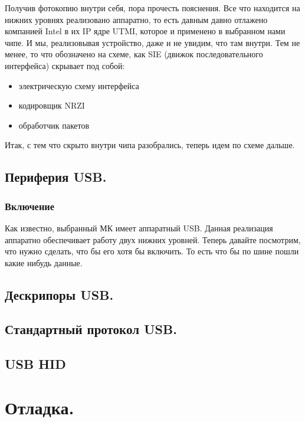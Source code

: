 \documentclass[12pt,a4paper]{article}
\begin{document}
    Получив фотокопию внутри себя, пора прочесть пояснения.
    Все что находится на нижних уровнях реализовано аппаратно, то есть давным
    давно отлажено компанией Intel в их IP ядре UTMI, которое и применено
    в выбранном нами чипе. И мы, реализовывая устройство,
    даже и не увидим, что там внутри. Тем не менее, то
    что обозначено на схеме, как SIE (движок последовательного интерфейса)
    скрывает под собой:
\begin{itemize}
    \item электрическую схему интерфейса
    \item кодировщик NRZI
    \item обработчик пакетов
\end{itemize}
    Итак, с тем что скрыто внутри чипа разобрались, теперь идем по схеме дальше.



\subsection{Периферия USB.}
\subsubsection{Включение}
    Как известно, выбранный МК имеет аппаратный USB. Данная реализация аппаратно
    обеспечивает работу двух нижних уровней. Теперь давайте посмотрим,
    что нужно сделать, что бы его хотя бы включить. То есть что бы по шине пошли
    какие нибудь данные.

\subsection{Дескрипоры USB.}

\subsection{Стандартный протокол USB.}

\subsection{USB HID}

\section{Отладка.}


\end{document}
